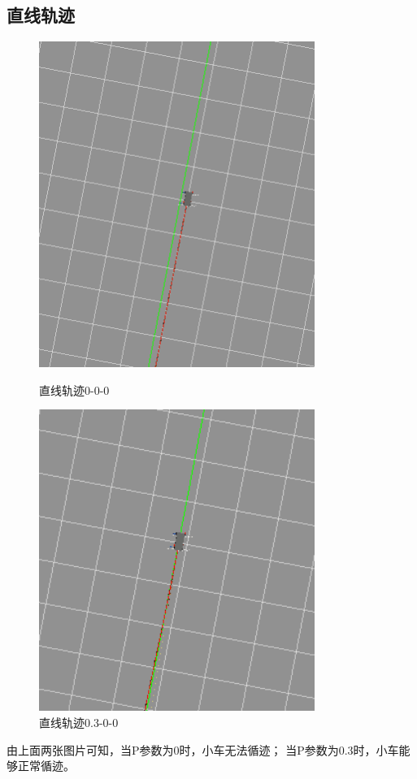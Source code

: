 \documentclass{xjtureport}
\begin{document}
\subsection{直线轨迹}
\begin{figure}[H]
    \centering
    \begin{minipage}[t]{0.48\textwidth}
        \centering
        \includegraphics[width=0.8\textwidth]{figures/line000.png}
        \caption{直线轨迹0-0-0}
    \end{minipage}
    \begin{minipage}[t]{0.48\textwidth}
        \centering
        \includegraphics[width=0.8\textwidth]{figures/line300.png}
        \caption{直线轨迹0.3-0-0}
    \end{minipage}
\end{figure}
由上面两张图片可知，当P参数为0时，小车无法循迹；
当P参数为0.3时，小车能够正常循迹。
\end{document}

